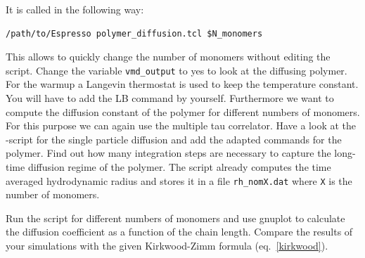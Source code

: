It is called in the following way:
{\vspace{0,2cm}\small
\begin{lstlisting}[numbers=none]
/path/to/Espresso polymer_diffusion.tcl $N_monomers  
\end{lstlisting}\vspace{0,2cm}
}
This allows to quickly change the number of monomers without editing 
the script. Change the variable  \lstinline|vmd_output| to yes to 
look at the diffusing polymer.
For the warmup a Langevin thermostat is used to keep the temperature constant.
You will have to add the LB command by yourself.
Furthermore we want to compute the diffusion constant of the polymer for
different numbers of monomers. For this purpose we can again use the multiple
tau correlator. Have a look at the \ES{} -script for the single particle diffusion
and add the adapted commands for the polymer. Find out how many integration steps are
necessary to capture the long-time diffusion regime of the polymer. The script
already computes the time averaged hydrodynamic radius and stores it in a file
\lstinline|rh_nomX.dat| where \lstinline|X| is the number of monomers.

Run the script for different numbers of monomers and use gnuplot to calculate
the diffusion coefficient as a function of the chain length. Compare the results
of your \ES{} simulations with the given Kirkwood-Zimm formula
(eq.~\ref{kirkwood}).
